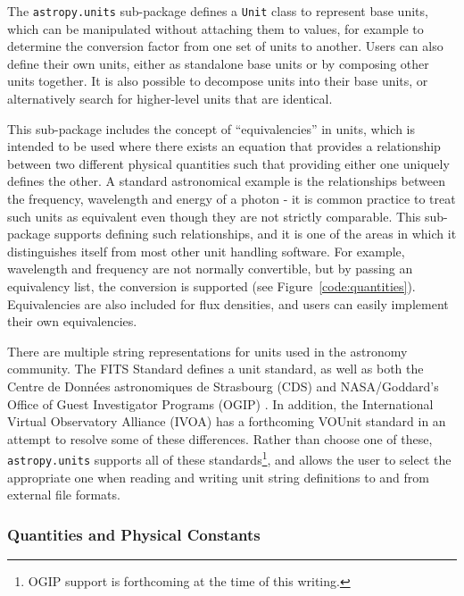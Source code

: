 \documentclass[traditabstract]{aa}
\begin{document}
The \texttt{astropy.units} sub-package defines a \texttt{Unit} class to
represent base units, which can be manipulated without attaching them to
values, for example to determine the conversion factor from one set of units to
another. Users can also define their own units, either as standalone base units
or by composing other units together. It is also possible to decompose units
into their base units, or alternatively search for higher-level units that are
identical.

This sub-package includes the concept of ``equivalencies'' in units, which is
intended to be used where there exists an equation that provides a relationship
between two different physical quantities such that providing either one
uniquely defines the other. A standard astronomical example is the
relationships between the frequency, wavelength and energy of a photon - it is
common practice to treat such units as equivalent even though they are not
strictly comparable. This sub-package supports defining such relationships, and
it is one of the areas in which it distinguishes itself from most other unit
handling software. For example, wavelength and frequency are not normally
convertible, but by passing an equivalency list, the conversion is supported
(see Figure~\ref{code:quantities}). Equivalencies are also included for flux
densities, and users can easily implement their own equivalencies.

There are multiple string representations for units used in the astronomy
community. The FITS Standard \cite{fits2008} defines a unit standard, as well
as both the Centre de Donn\'ees astronomiques de Strasbourg (CDS)
\citep{ochsenbein2000cds} and NASA/Goddard's Office of Guest Investigator
Programs (OGIP) \citep{george1995ogip}. In addition, the International Virtual
Observatory Alliance (IVOA) has a forthcoming VOUnit standard
\citep{derriere2012vounit} in an attempt to resolve some of these differences.
Rather than choose one of these, \texttt{astropy.units} supports all of these
standards\footnote{OGIP support is forthcoming at the time of this writing.},
and allows the user to select the appropriate one when reading and writing unit
string definitions to and from external file formats.

\subsubsection{Quantities and Physical Constants}

\label{sec:quantities}
\end{document}
